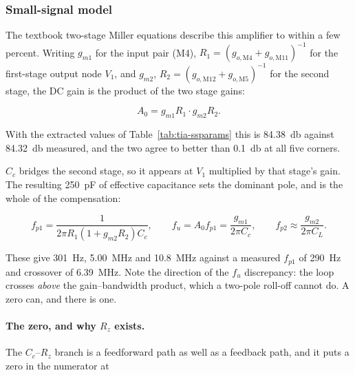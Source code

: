 %

\subsubsection{Small-signal model}\label{sss:tia-model}

The textbook two-stage Miller equations describe this amplifier to within a few
percent. Writing $g_{m1}$ for the input pair (M4),
$R_1 = (g_{o,\mathrm{M4}} + g_{o,\mathrm{M11}})^{-1}$ for the first-stage output node
$V_1$, and $g_{m2}$, $R_2 = (g_{o,\mathrm{M12}} + g_{o,\mathrm{M5}})^{-1}$ for the
second stage, the DC gain is the product of the two stage gains:

\begin{equation}\label{eq:tia-a0}
  A_0 = g_{m1} R_1 \cdot g_{m2} R_2 .
\end{equation}

With the extracted values of Table~\ref{tab:tia-ssparams} this is
\SI{84.38}{\decibel} against \SI{84.32}{\decibel} measured, and the two agree to
better than \SI{0.1}{\decibel} at all five corners.

$C_c$ bridges the second stage, so it appears at $V_1$ multiplied by that stage's gain.
The resulting \SI{250}{\pico\farad} of effective capacitance sets the dominant pole,
and is the whole of the compensation:

\begin{equation}\label{eq:tia-poles}
  f_{p1} = \frac{1}{2\pi R_1 (1 + g_{m2} R_2) C_c},
  \qquad
  f_u = A_0 f_{p1} = \frac{g_{m1}}{2\pi C_c},
  \qquad
  f_{p2} \approx \frac{g_{m2}}{2\pi C_L}.
\end{equation}

These give \SI{301}{\hertz}, \SI{5.00}{\mega\hertz} and \SI{10.8}{\mega\hertz} against a
measured $f_{p1}$ of \SI{290}{\hertz} and crossover of \SI{6.39}{\mega\hertz}. Note the
direction of the $f_u$ discrepancy: the loop crosses \emph{above} the gain--bandwidth
product, which a two-pole roll-off cannot do. A zero can, and there is one.

\paragraph{The zero, and why $R_z$ exists.}
The $C_c$--$R_z$ branch is a feedforward path as well as a feedback path, and it puts a
zero in the numerator at

